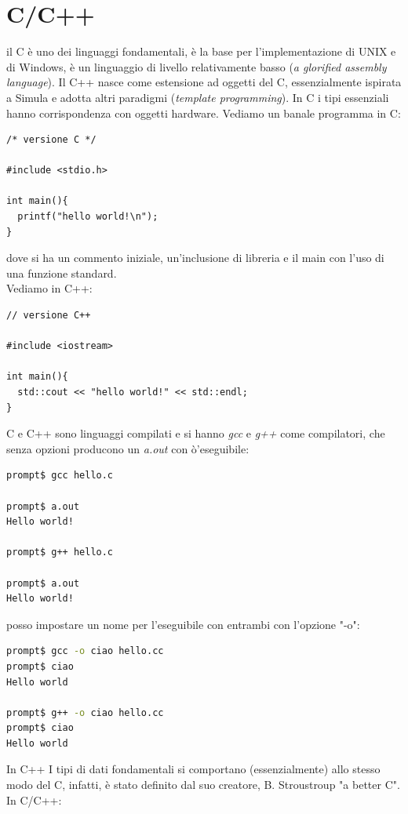 \documentclass[a4paper,12pt, oneside]{book}
\begin{document}
\chapter{C/C++}
il C è uno dei linguaggi fondamentali, è la base per l'implementazione di UNIX e di Windows, è un linguaggio di livello relativamente basso (\textit{a glorified assembly
language}). Il C++ nasce come estensione ad oggetti del C, essenzialmente ispirata a Simula e adotta altri paradigmi (\textit{template programming}). In C i tipi essenziali hanno corrispondenza con oggetti hardware. Vediamo un banale programma in C:
\begin{verbatim}
/* versione C */

#include <stdio.h>

int main(){
  printf("hello world!\n");
}
\end{verbatim}
dove si ha un commento iniziale, un'inclusione di libreria e il main con l'uso di una funzione standard.\\ Vediamo in C++:
\begin{verbatim}
// versione C++ 

#include <iostream>

int main(){
  std::cout << "hello world!" << std::endl;
}
\end{verbatim}
C e C++ sono linguaggi compilati e si hanno \textit{gcc} e \textit{g++} come compilatori, che senza opzioni producono un \textit{a.out }con ò'eseguibile:
\begin{shaded}
\begin{lstlisting}[language=bash]
prompt$ gcc hello.c

prompt$ a.out
Hello world!

prompt$ g++ hello.c

prompt$ a.out
Hello world!
\end{lstlisting}
\end{shaded}
posso impostare un nome per l'eseguibile con entrambi con l'opzione "-o":
\begin{shaded}
\begin{lstlisting}[language=bash]
prompt$ gcc -o ciao hello.cc
prompt$ ciao
Hello world

prompt$ g++ -o ciao hello.cc
prompt$ ciao
Hello world
\end{lstlisting}
\end{shaded}
In C++ I tipi di dati fondamentali si comportano (essenzialmente) allo stesso modo del C, infatti, è stato definito dal suo creatore, B. Stroustroup
"a better C".
\\
In C/C++:
\end{document}
